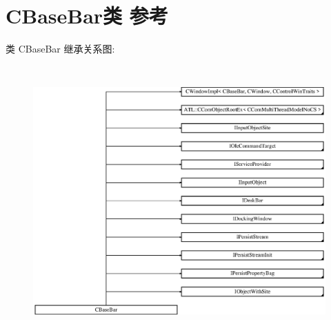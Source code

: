 \hypertarget{class_c_base_bar}{}\section{C\+Base\+Bar类 参考}
\label{class_c_base_bar}
类 C\+Base\+Bar 继承关系图\+:\begin{figure}[H]
\begin{center}
\leavevmode
\includegraphics[height=10.340908cm]{class_c_base_bar}
\end{center}
\end{figure}
